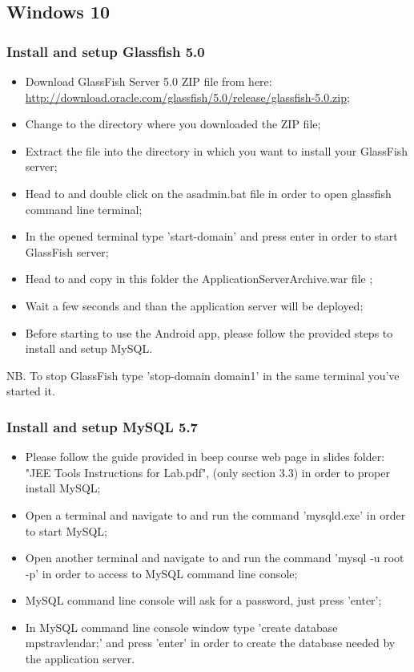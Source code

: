 \subsection{Windows 10}
\label{subsect:Windows 10}

\subsubsection{Install and setup Glassfish 5.0}
\begin{itemize}
	\item Download GlassFish Server 5.0 ZIP file from here: \\ \href{http://download.oracle.com/glassfish/5.0/release/glassfish-5.0.zip}{\color{blue}http://download.oracle.com/glassfish/5.0/release/glassfish-5.0.zip};
	\item Change to the directory where you downloaded the ZIP file;
	\item Extract the file into the directory in which you want to install your GlassFish server;
	\item Head to  and double click on the asadmin.bat file in order to open glassfish command line terminal;
	\item In the opened terminal type 'start-domain' and press enter in order to start GlassFish server;
	\item Head to  and copy in this folder the ApplicationServerArchive.war file ;
	\item Wait a few seconds and than the application server will be deployed;
	\item Before starting to use the Android app, please follow the provided steps to install and setup MySQL.
\end{itemize} 
NB. To stop GlassFish type 'stop-domain domain1' in the same terminal you've started it.

\subsubsection{Install and setup MySQL 5.7}
\begin{itemize}
	\item Please follow the guide provided in beep course web page in slides folder: "JEE Tools Instructions for Lab.pdf", (only section 3.3) in order to proper install MySQL;
	\item Open a terminal and navigate to  and run the command 'mysqld.exe' in order to start MySQL;
	\item Open another terminal and navigate to  and run the command 'mysql -u root -p' in order to access to MySQL command line console;
	\item MySQL command line console will ask for a password, just press 'enter';
	\item In MySQL command line console window type 'create database mps\textunderscore travlendar;' and press 'enter' in order to create the database needed by the application server.
\end{itemize}
	
